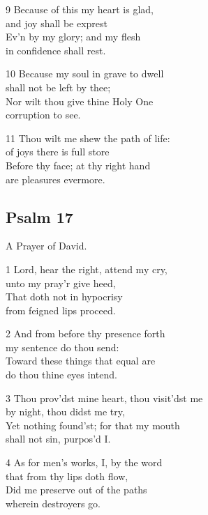 9 Because of this my heart is glad,\\
and joy shall be exprest\\
Ev’n by my glory; and my flesh\\
in confidence shall rest.

10 Because my soul in grave to dwell\\
shall not be left by thee;\\
Nor wilt thou give thine Holy One\\
corruption to see.

11 Thou wilt me shew the path of life:\\
of joys there is full store\\
Before thy face; at thy right hand\\
are pleasures evermore.

\begin{center}
\quad{}\quad{}
\end{center}

\subsection*{Psalm 17 }

A Prayer of David.

1 Lord, hear the right, attend my cry,\\
unto my pray’r give heed,\\
That doth not in hypocrisy\\
from feigned lips proceed.

2 And from before thy presence forth\\
my sentence do thou send:\\
Toward these things that equal are\\
do thou thine eyes intend.

3 Thou prov’dst mine heart, thou visit’dst me\\
by night, thou didst me try,\\
Yet nothing found’st; for that my mouth\\
shall not sin, purpos’d I.

4 As for men’s works, I, by the word\\
that from thy lips doth flow,\\
Did me preserve out of the paths\\
wherein destroyers go.

